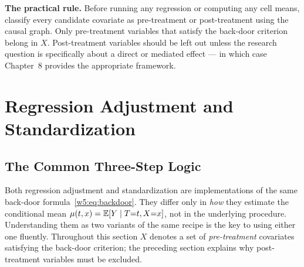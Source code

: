 \documentclass[master.tex]{subfiles}
\begin{document}
\medskip\noindent\textbf{The practical rule.}  Before running any
regression or computing any cell means, classify every candidate
covariate as pre-treatment or post-treatment using the causal graph.
Only pre-treatment variables that satisfy the back-door criterion
belong in $X$.  Post-treatment variables should be left out unless the
research question is specifically about a direct or mediated effect ---
in which case Chapter~8 provides the appropriate framework.

\section{Regression Adjustment and Standardization}
\label{w5:sec:regression}

\subsection{The Common Three-Step Logic}

Both regression adjustment and standardization are implementations of
the same back-door formula~\eqref{w5:eq:backdoor}.  They differ only in
\emph{how} they estimate the conditional mean
$\mu(t, x) = \mathbb{E}[Y \mid T{=}t, X{=}x]$, not in the underlying procedure.
Understanding them as two variants of the same recipe is the key to
using either one fluently.  Throughout this section $X$ denotes a set
of \emph{pre-treatment} covariates satisfying the back-door criterion;
the preceding section explains why post-treatment variables must be
excluded.
\end{document}
